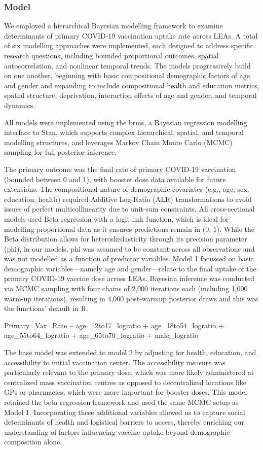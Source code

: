 \documentclass{article}
\begin{document}
\subsubsection{Model}\label{model}

We employed a hierarchical Bayesian modelling framework to examine
determinants of primary COVID-19 vaccination uptake rate across LEAs. A
total of six modelling approaches were implemented, each designed to
address specific research questions, including bounded proportional
outcomes, spatial autocorrelation, and nonlinear temporal trends. The
models progressively build on one another, beginning with basic
compositional demographic factors of age and gender and expanding to
include compositional health and education metrics, spatial structure,
deprivation, interaction effects of age and gender, and temporal
dynamics.

All models were implemented using the brms, a Bayesian regression
modelling interface to Stan, which supports complex hierarchical,
spatial, and temporal modelling structures, and leverages Markov Chain
Monte Carlo (MCMC) sampling for full posterior inference.

The primary outcome was the final rate of primary COVID-19 vaccination
(bounded between 0 and 1), with booster dose data available for future
extensions. The compositional nature of demographic covariates (e.g.,
age, sex, education, health) required Additive Log-Ratio (ALR)
transformations to avoid issues of perfect multicollinearity due to
unit-sum constraints. All cross-sectional models used Beta regression
with a logit link function, which is ideal for modelling proportional
data as it ensures predictions remain in (0, 1). While the Beta
distribution allows for heteroskedasticity through its precision
parameter (phi), in our models, phi was assumed to be constant across
all observations and was not modelled as a function of predictor
variables. Model 1 focussed on basic demographic variables---namely age
and gender---relate to the final uptake of the primary COVID-19 vaccine
dose across LEAs. Bayesian inference was conducted via MCMC sampling
with four chains of 2,000 iterations each (including 1,000 warm-up
iterations), resulting in 4,000 post-warmup posterior draws and this was
the functions' default in R.

Primary\_Vax\_Rate \textasciitilde{} age\_12to17\_logratio +
age\_18to54\_logratio + age\_55to64\_logratio + age\_65to70\_logratio +
male\_logratio

The base model was extended to model 2 by adjusting for health,
education, and accessibility to initial vaccination center. The
accessibility measure was particularly relevant to the primary dose,
which was more likely administered at centralized mass vaccination
centres as opposed to decentralized locations like GPs or pharmacies,
which were more important for booster doses. This model retained the
beta regression framework and used the same MCMC setup as Model 1.
Incorporating these additional variables allowed us to capture social
determinants of health and logistical barriers to access, thereby
enriching our understanding of factors influencing vaccine uptake beyond
demographic composition alone.
\end{document}
